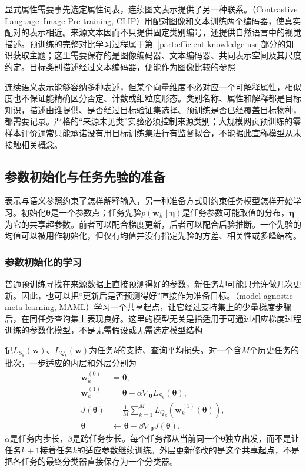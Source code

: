 显式属性需要事先选定属性词表，连续图文表示提供了另一种联系。（Contrastive Language--Image Pre-training, CLIP）用配对图像和文本训练两个编码器，使真实配对的表示相近。来源文本因而不只提供固定类别编号，还提供自然语言中的视觉描述。预训练的完整对比学习过程属于第~\ref{part:efficient-knowledge-use}部分的知识获取主题；这里需要保存的是图像编码器、文本编码器、共同表示空间及其尺度约定。目标类别描述经过文本编码器，便能作为图像比较的参照

连续语义表示能够容纳多种表述，但某个向量维度不必对应一个可解释属性，相似度也不保证能精确区分否定、计数或细粒度形态。类别名称、属性和解释都是目标知识，描述由谁提供、是否经过目标验证集选择、预训练是否已经覆盖目标物种，都需要记录。严格的“来源未见类”实验必须控制来源类别；大规模网页预训练的零样本评价通常只能承诺没有用目标训练集进行有监督拟合，不能据此宣称模型从未接触相关概念。

\subsection{参数初始化与任务先验的准备}
\label{sec:ket-transfer-initialization-prior}

表示与语义参照约束了怎样解释输入，另一种准备方式则约束任务模型怎样开始学习。初始化$\bm{\theta}$是一个参数点；任务先验$p(\bm w_k\mid\bm\eta)$是任务参数可能取值的分布，$\bm\eta$为它的共享超参数。前者可以配合梯度更新，后者可以配合后验推断。一个先验的均值可以被用作初始化，但仅有均值并没有指定先验的方差、相关性或多峰结构。

\subsubsection{参数初始化的学习}
\label{sec:ket-transfer-maml}

普通预训练寻找在来源数据上直接预测得好的参数，新任务却可能只允许做几次更新。因此，也可以把“更新后是否预测得好”直接作为准备目标。（model-agnostic meta-learning, MAML）学习一个共享起点，让它经过支持集上的少量梯度步骤后，在同任务查询集上表现良好。这里的模型无关是指适用于可通过相应梯度过程训练的参数化模型，不是无需假设或无需选定模型结构

记$L_{S_k}(\bm w)$、$L_{Q_k}(\bm w)$为任务$k$的支持、查询平均损失。对一个含$M$个历史任务的批次，一步适应的内层和外层分别为
\begin{align}
  \bm w_k^{(0)}&=\bm{\theta}, \nonumber\\
  \bm w_k^{(1)}&=\bm{\theta}
       -\alpha\nabla_{\bm{\theta}}L_{S_k}(\bm{\theta}),
       \label{eq:ket-transfer-maml-inner}\\
  J(\bm{\theta})&=\frac{1}{M}\sum_{k=1}^{M}
       L_{Q_k}(\bm w_k^{(1)}(\bm{\theta})), \nonumber\\
  \bm{\theta}&\leftarrow\bm{\theta}-\beta\nabla_{\bm{\theta}}J(\bm{\theta}).
       \label{eq:ket-transfer-maml-outer}
\end{align}
$\alpha$是任务内步长，$\beta$是跨任务步长。每个任务都从当前同一个$\bm{\theta}$独立出发，而不是让任务$k+1$接着任务$k$的适应参数继续训练。外层更新修改的是这个共享起点，不是把各任务的最终分类器直接保存为一个分类器。


